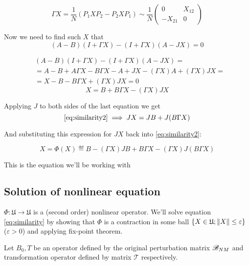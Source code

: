 \documentclass{article}
\begin{document}
\[
    \Gamma X = \frac{1}{N} (P_1 X P_2 - P_2 X P_1) \sim
    \frac{1}{N}
    \begin{pmatrix}
        0       & X_{12} \\
        -X_{21} & 0
    \end{pmatrix}
    \]

Now we need to find such \( X \) that
\begin{equation}\label{eq:similarity1}
    (A - B)(I + \Gamma X) - (I + \Gamma X)(A - JX) = 0
\end{equation}

\[\begin{aligned}
    & (A - B)(I + \Gamma X) - (I + \Gamma X)(A - JX) = \\
    & = A - B + A\Gamma X - B\Gamma X - A + JX - (\Gamma X) A + (\Gamma X) JX = \\
    & = X - B - B\Gamma X + (\Gamma X) JX = 0
\end{aligned}\]
\begin{equation}\label{eq:similarity2}
    X = B + B\Gamma X - (\Gamma X) JX
\end{equation}

Applying \( J \) to both sides of the last equation we get
\[\eqref{eq:similarity2} \implies
JX = JB + J(B\Gamma X)\]

And substituting this expression for \( JX \) back into \eqref{eq:similarity2}:

\begin{equation}\label{eq:similarity}
    X = \Phi(X) \eqdef B - (\Gamma X) JB + B\Gamma X - (\Gamma X) J(B\Gamma X)
\end{equation}

This is the equation we'll be working with

\subsection{Solution of nonlinear equation}
\( \Phi:\mathfrak U\to\mathfrak U \) is a (second order) nonlinear operator.
We'll solve equation \eqref{eq:similarity}
by showing that \( \Phi \) is a contraction in some ball \( \{ X\in \mathfrak U; \left\|{X}\right\| \leq \varepsilon \} \) (\( \varepsilon>0 \))
and applying fix-point theorem.

Let \( B_0, T \) be an operator defined by the original perturbation matrix \( \mathscr{B}_{{N}{M}} \)
and transformation operator defined by matrix \( \mathcal T \) respectively.
\end{document}
